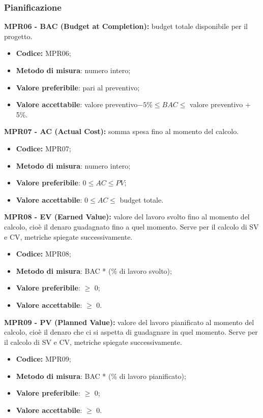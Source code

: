 \subsubsection{Pianificazione}
\textbf{MPR06 - BAC (Budget at Completion):} budget totale disponibile per il progetto.
\begin{itemize}
    \item \textbf{Codice:} MPR06;
    \item \textbf{Metodo di misura}: numero intero;
    \item \textbf{Valore preferibile}: pari al preventivo;
    \item \textbf{Valore accettabile}: valore preventivo$ - 5\% \leq BAC \leq$ valore preventivo + 5\%.
\end{itemize}
\textbf{MPR07 - AC (Actual Cost):} somma spesa fino al momento del calcolo.
\begin{itemize}
    \item \textbf{Codice:} MPR07;
    \item \textbf{Metodo di misura}: numero intero;
    \item \textbf{Valore preferibile}: $0 \leq AC \leq PV$;
    \item \textbf{Valore accettabile}: $0 \leq AC \leq$ budget totale.
\end{itemize}
\textbf{MPR08 - EV (Earned Value):} valore del lavoro svolto fino al momento del calcolo, cioè il denaro guadagnato fino a quel momento.
Serve per il calcolo di SV e CV, metriche spiegate successivamente.
\begin{itemize}
    \item \textbf{Codice:} MPR08;
    \item \textbf{Metodo di misura}: BAC * (\% di lavoro svolto);
    \item \textbf{Valore preferibile}: $\geq$ 0;
    \item \textbf{Valore accettabile}: $\geq$ 0.
\end{itemize}
\textbf{MPR09 - PV (Planned Value):} valore del lavoro pianificato al momento del calcolo, cioè il denaro che ci si aspetta di guadagnare in quel momento.
Serve per il calcolo di SV e CV, metriche spiegate successivamente.
\begin{itemize}
    \item \textbf{Codice:} MPR09;
    \item \textbf{Metodo di misura}: BAC * (\% di lavoro pianificato);
    \item \textbf{Valore preferibile}: $\geq$ 0;
    \item \textbf{Valore accettabile}: $\geq$ 0.
\end{itemize}

